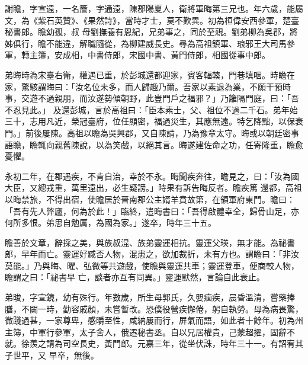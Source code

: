
\begin{pinyinscope}

 謝瞻，字宣遠，一名簷，字通遠，陳郡陽夏人，衛將軍晦第三兄也。年六歲，能屬文，為《紫石英贊》、《果然詩》，當時才士，莫不歎異。初為桓偉安西參軍，楚臺秘書郎。瞻幼孤，叔
 母劉撫養有恩紀，兄弟事之，同於至親。劉弟柳為吳郡，將姊俱行，瞻不能違，解職隨從，為柳建威長史。尋為高祖鎮軍、琅邪王大司馬參軍，轉主簿，安成相，中書侍郎，宋國中書、黃門侍郎，相國從事中郎。



 弟晦時為宋臺右衛，權遇已重，於彭城還都迎家，賓客輻輳，門巷填咽。時瞻在家，驚駭謂晦曰：「汝名位未多，而人歸趣乃爾。吾家以素退為業，不願干預時事，交遊不過親朋，而汝遂勢傾朝野，此豈門戶之福邪？」乃籬隔門庭，曰：「吾不忍見此。」
 及還彭城，言於高祖曰：「臣本素士，父、祖位不過二千石。弟年始三十，志用凡近，榮冠臺府，位任顯密，福過災生，其應無遠。特乞降黜，以保衰門。」前後屢陳。高祖以瞻為吳興郡，又自陳請，乃為豫章太守。晦或以朝廷密事語瞻，瞻輒向親舊陳說，以為笑戲，以絕其言。晦遂建佐命之功，任寄隆重，瞻愈憂懼。



 永初二年，在郡遇疾，不肯自治，幸於不永。晦聞疾奔往，瞻見之，曰：「汝為國大臣，又總戎重，萬里遠出，必生疑謗。」時果有訴告晦反者。瞻疾篤
 還都，高祖以晦禁旅，不得出宿，使瞻居於晉南郡公主婿羊賁故第，在領軍府東門。瞻曰：「吾有先人弊廬，何為於此！」臨終，遣晦書曰：「吾得啟體幸全，歸骨山足，亦何所多恨。弟思自勉厲，為國為家。」遂卒，時年三十五。



 瞻善於文章，辭採之美，與族叔混、族弟靈運相抗。靈運父瑛，無才能。為祕書郎，早年而亡。靈運好臧否人物，混患之，欲加裁折，未有方也。謂瞻曰：「非汝莫能。」乃與晦、曜、弘微等共遊戲，使瞻與靈運共車；靈運登車，便商較人物，瞻謂之曰：「祕書早
 亡，談者亦互有同異。」靈運默然，言論自此衰止。



 弟晙，字宣鏡，幼有殊行。年數歲，所生母郭氏，久嬰痼疾，晨昏溫清，嘗藥捧膳，不闕一時，勤容戚顏，未嘗暫改。恐僕役營疾懈倦，躬自執勞。母為病畏驚，微踐過甚，一家尊卑，感㬭至性，咸納屢而行，屏氣而語，如此者十餘年。初為州主簿，中軍行參軍，太子舍人，俄遷秘書丞。自以兄居權貴，己蒙超擢，固辭不就。徐羨之請為司空長史，黃門郎。元嘉三年，從坐伏誅，時年三十一。有詔宥其子世平，又
 早卒，無後。




\end{pinyinscope}
